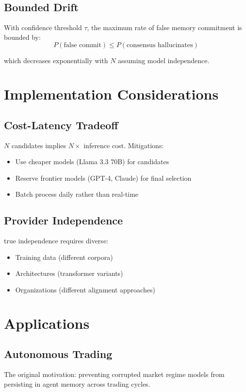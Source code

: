 \documentclass[11pt,a4paper]{article}
\begin{document}
\subsection{Bounded Drift}

With confidence threshold $\tau$, the maximum rate of false memory 
commitment is bounded by:
\[
P(\text{false commit}) \leq P(\text{consensus hallucinates})
\]

which decreases exponentially with $N$ assuming model independence.

\section{Implementation Considerations}

\subsection{Cost-Latency Tradeoff}

$N$ candidates implies $N \times$ inference cost. Mitigations:
\begin{itemize}
  \item Use cheaper models (Llama 3.3 70B) for candidates
  \item Reserve frontier models (GPT-4, Claude) for final selection
  \item Batch process daily rather than real-time
\end{itemize}

\subsection{Provider Independence}

true independence requires diverse:\
\begin{itemize}
  \item Training data (different corpora)
  \item Architectures (transformer variants)
  \item Organizations (different alignment approaches)
\end{itemize}

\section{Applications}

\subsection{Autonomous Trading}
The original motivation: preventing corrupted market regime models 
from persisting in agent memory across trading cycles.
\end{document}
